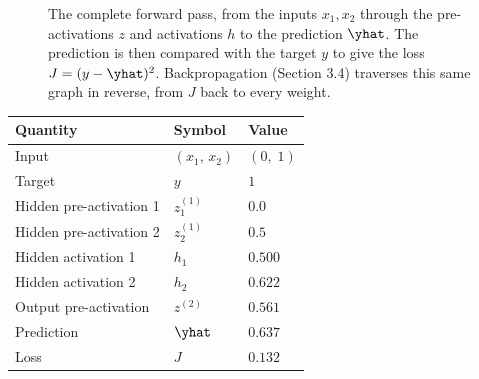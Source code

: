 \documentclass[12pt, a4paper]{article}
\begin{document}
\begin{figure}[H]
  \caption{The complete forward pass, from the inputs $x_1, x_2$ through the
    pre-activations $z$ and activations $h$ to the prediction $\yhat$. The
    prediction is then compared with the target $y$ to give the loss
    $J = (y - \yhat)^2$. Backpropagation (Section 3.4) traverses this same
    graph in reverse, from $J$ back to every weight.}
  \label{fig:forward-pass-z-with-loss}
\end{figure}

\begin{center}
  \renewcommand{\arraystretch}{1.4}
  \begin{tabular}{lll}
    \toprule
    Quantity                & Symbol         & Value      \\
    \midrule
    Input                   & $(x_1,\, x_2)$ & $(0,\; 1)$ \\
    Target                  & $y$            & $1$        \\
    \midrule
    Hidden pre-activation 1 & $z^{(1)}_1$    & $0.0$      \\
    Hidden pre-activation 2 & $z^{(1)}_2$    & $0.5$      \\
    Hidden activation 1     & $h_1$          & $0.500$    \\
    Hidden activation 2     & $h_2$          & $0.622$    \\
    \midrule
    Output pre-activation   & $z^{(2)}$      & $0.561$    \\
    Prediction              & $\yhat$        & $0.637$    \\
    \midrule
    Loss                    & $J$            & $0.132$    \\
    \bottomrule
  \end{tabular}
\end{center}
\end{document}
